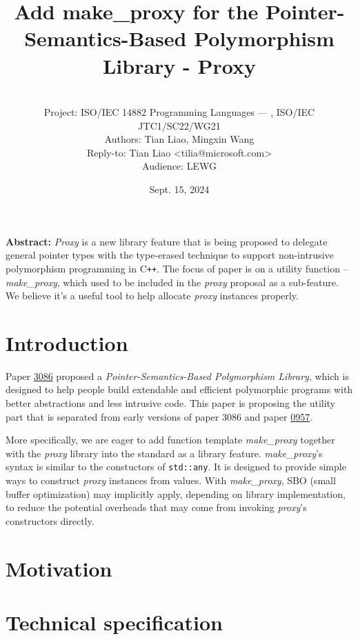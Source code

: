 \documentclass[10pt, a4paper, oneside]{article}
\title{Add make\_proxy for the Pointer-Semantics-Based
Polymorphism Library - Proxy}
\date{Sept. 15, 2024}
\author{%
\ \\
Project: ISO/IEC 14882 Programming Languages — \Cpp, ISO/IEC JTC1/SC22/WG21\\
Authors: Tian Liao, Mingxin Wang\\
Reply-to: Tian Liao \textless tilia@microsoft.com\textgreater \\
Audience: LEWG\\
}
\makeatletter
\newcommand{\Cpp}{C\texttt{++}}
\renewcommand{\maketitle}{\bgroup\setlength{\parindent}{0pt}
\begin{flushleft}
  \textbf{\huge \@title}

  \@author
\end{flushleft}\egroup
}
\makeatother
\begin{document}
\maketitle

\textbf{Abstract:} \textit{Proxy} is a new library feature that is being proposed to delegate general pointer types
with the type-erased technique to support non-intrusive polymorphism programming in \Cpp.
The focus of paper is on a utility function -- \textit{make\_proxy}, which used to be included in the \textit{proxy} proposal as a sub-feature.
We believe it's a useful tool to help allocate \textit{proxy} instances properly.

\section{Introduction}

Paper \href{https://wg21.link/p3086}{3086} proposed a \textit{Pointer-Semantics-Based Polymorphism Library},
which is designed to help people build extendable and efficient polymorphic programs with better abstractions and less intrusive code.
This paper is proposing the utility part that is separated from early versions of paper 3086 and paper \href{https://wg21.link/p0957}{0957}.

More specifically, we are eager to add function template \textit{make\_proxy} together with the \textit{proxy} library into the standard as a library feature.
\textit{make\_proxy}'s syntax is similar to the constuctors of \verb|std::any|. It is designed to provide simple ways to construct \textit{proxy} instances from values.
With \textit{make\_proxy}, SBO (small buffer optimization) may implicitly apply, depending on library implementation, to reduce the potential overheads that may come from invoking \textit{proxy}'s constructors directly.

\section{Motivation}
\lipsum[1]

\section{Technical specification}
\lipsum[1]
\end{document}

